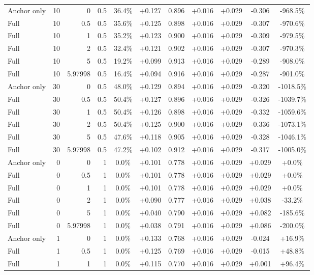 \begin{table}[htbp]
\begin{tabular}{lrrrccccccc}
Anchor only & 10 & 0 & 0.5 & 36.4\% & +0.127 & 0.896 & +0.016 & +0.029 & -0.306 & -968.5\% \\
Full & 10 & 0.5 & 0.5 & 35.6\% & +0.125 & 0.898 & +0.016 & +0.029 & -0.307 & -970.6\% \\
Full & 10 & 1 & 0.5 & 35.2\% & +0.123 & 0.900 & +0.016 & +0.029 & -0.309 & -979.5\% \\
Full & 10 & 2 & 0.5 & 32.4\% & +0.121 & 0.902 & +0.016 & +0.029 & -0.307 & -970.3\% \\
Full & 10 & 5 & 0.5 & 19.2\% & +0.099 & 0.913 & +0.016 & +0.029 & -0.289 & -908.0\% \\
Full & 10 & 5.97998 & 0.5 & 16.4\% & +0.094 & 0.916 & +0.016 & +0.029 & -0.287 & -901.0\% \\
Anchor only & 30 & 0 & 0.5 & 48.0\% & +0.129 & 0.894 & +0.016 & +0.029 & -0.320 & -1018.5\% \\
Full & 30 & 0.5 & 0.5 & 50.4\% & +0.127 & 0.896 & +0.016 & +0.029 & -0.326 & -1039.7\% \\
Full & 30 & 1 & 0.5 & 50.4\% & +0.126 & 0.898 & +0.016 & +0.029 & -0.332 & -1059.6\% \\
Full & 30 & 2 & 0.5 & 50.4\% & +0.125 & 0.900 & +0.016 & +0.029 & -0.336 & -1073.1\% \\
Full & 30 & 5 & 0.5 & 47.6\% & +0.118 & 0.905 & +0.016 & +0.029 & -0.328 & -1046.1\% \\
Full & 30 & 5.97998 & 0.5 & 47.2\% & +0.102 & 0.912 & +0.016 & +0.029 & -0.317 & -1005.0\% \\
Anchor only & 0 & 0 & 1 & 0.0\% & +0.101 & 0.778 & +0.016 & +0.029 & +0.029 & +0.0\% \\
Full & 0 & 0.5 & 1 & 0.0\% & +0.101 & 0.778 & +0.016 & +0.029 & +0.029 & +0.0\% \\
Full & 0 & 1 & 1 & 0.0\% & +0.101 & 0.778 & +0.016 & +0.029 & +0.029 & +0.0\% \\
Full & 0 & 2 & 1 & 0.0\% & +0.090 & 0.777 & +0.016 & +0.029 & +0.038 & -33.2\% \\
Full & 0 & 5 & 1 & 0.0\% & +0.040 & 0.790 & +0.016 & +0.029 & +0.082 & -185.6\% \\
Full & 0 & 5.97998 & 1 & 0.0\% & +0.038 & 0.791 & +0.016 & +0.029 & +0.086 & -200.0\% \\
Anchor only & 1 & 0 & 1 & 0.0\% & +0.133 & 0.768 & +0.016 & +0.029 & -0.024 & +16.9\% \\
Full & 1 & 0.5 & 1 & 0.0\% & +0.125 & 0.769 & +0.016 & +0.029 & -0.015 & +48.8\% \\
Full & 1 & 1 & 1 & 0.0\% & +0.115 & 0.770 & +0.016 & +0.029 & +0.001 & +96.4\% \\

\end{tabular}
\end{table}
